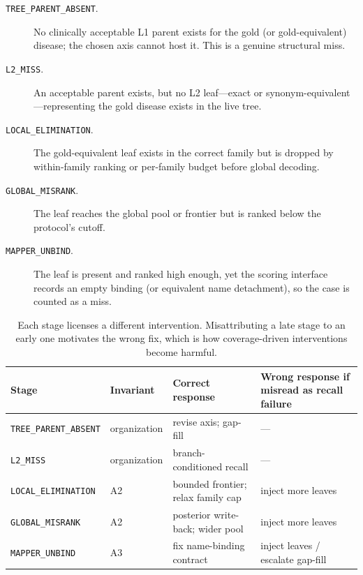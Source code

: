 \begin{description}
  \item[\texttt{TREE\_PARENT\_ABSENT}.]
  No clinically acceptable L1 parent exists for the gold (or gold-equivalent) disease; the chosen axis cannot host it.
  This is a genuine structural miss.
  \item[\texttt{L2\_MISS}.]
  An acceptable parent exists, but no L2 leaf---exact or synonym-equivalent---representing the gold disease exists in the live tree.
  \item[\texttt{LOCAL\_ELIMINATION}.]
  The gold-equivalent leaf exists in the correct family but is dropped by within-family ranking or per-family budget before global decoding.
  \item[\texttt{GLOBAL\_MISRANK}.]
  The leaf reaches the global pool or frontier but is ranked below the protocol's cutoff.
  \item[\texttt{MAPPER\_UNBIND}.]
  The leaf is present and ranked high enough, yet the scoring interface records an empty binding (or equivalent name detachment), so the case is counted as a miss.
\end{description}

\begin{table}[t]
\centering
\small
\caption{Each stage licenses a different intervention. Misattributing a late stage to an early one motivates the wrong fix, which is how coverage-driven interventions become harmful.}
\label{tab:stages}
\begin{tabular}{llp{3.1cm}p{3.1cm}}
\toprule
Stage & Invariant & Correct response & Wrong response if misread as recall failure \\
\midrule
\texttt{TREE\_PARENT\_ABSENT} & organization & revise axis; gap-fill & --- \\
\texttt{L2\_MISS} & organization & branch-conditioned recall & --- \\
\texttt{LOCAL\_ELIMINATION} & A2 & bounded frontier; relax family cap & inject more leaves \\
\texttt{GLOBAL\_MISRANK} & A2 & posterior write-back; wider pool & inject more leaves \\
\texttt{MAPPER\_UNBIND} & A3 & fix name-binding contract & inject leaves / escalate gap-fill \\
\bottomrule
\end{tabular}
\end{table}

